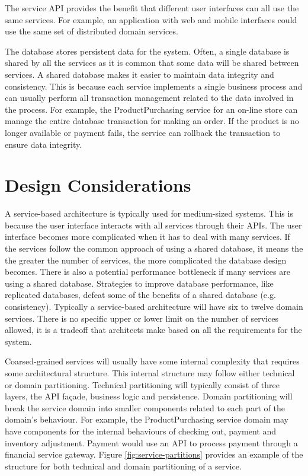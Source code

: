 The service API provides the benefit that different user interfaces can all use the same services.
For example, an application with web and mobile interfaces could use the same set of distributed domain services.

The database stores persistent data for the system.
Often, a single database is shared by all the services as it is common that some data will be shared between services.
A shared database makes it easier to maintain data integrity and consistency.
This is because each service implements a single business process
and can usually perform all transaction management related to the data involved in the process.
For example, the ProductPurchasing service for an on-line store can manage the entire database transaction for making an order.
If the product is no longer available or payment fails, the service can rollback the transaction to ensure data integrity.


\section{Design Considerations}

A service-based architecture is typically used for medium-sized systems.
This is because the user interface interacts with all services through their APIs.
The user interface becomes more complicated when it has to deal with many services.
If the services follow the common approach of using a shared database,
it means the the greater the number of services, the more complicated the database design becomes.
There is also a potential performance bottleneck if many services are using a shared database.
Strategies to improve database performance, like replicated databases, defeat some of the benefits of a shared database (e.g. consistency).
Typically a service-based architecture will have six to twelve domain services.
There is no specific upper or lower limit on the number of services allowed,
it is a tradeoff that architects make based on all the requirements for the system.

Coarsed-grained services will usually have some internal complexity that requires some architectural structure.
This internal structure may follow either technical or domain partitioning.
Technical partitioning will typically consist of three layers, the API façade, business logic and persistence.
Domain partitioning will break the service domain into smaller components related to each part of the domain's behaviour.
For example, the ProductPurchasing service domain may have components for the internal behaviours of checking out,
payment and inventory adjustment. Payment would use an API to process payment through a financial service gateway.
Figure \ref{fig:service-partitions} provides an example of the structure for both technical and domain partitioning of a service.

